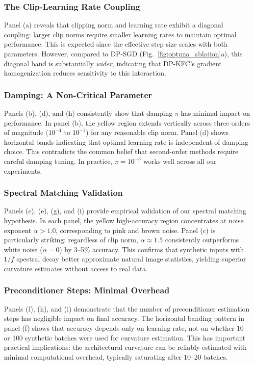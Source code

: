 \documentclass{article}
\theoremstyle{plain}
\theoremstyle{definition}
\theoremstyle{remark}
\begin{document}
  \subsubsection{The Clip-Learning Rate Coupling}

  Panel (a) reveals that clipping norm and learning rate exhibit a diagonal coupling: larger clip norms require smaller learning
  rates to maintain optimal performance. This is expected since the effective step size scales with both parameters. However,
  compared to DP-SGD (Fig.~\ref{fig:optuna_ablation}a), this diagonal band is substantially \textit{wider}, indicating that
  DP-KFC's gradient homogenization reduces sensitivity to this interaction.

  \subsubsection{Damping: A Non-Critical Parameter}

  Panels (b), (d), and (h) consistently show that damping $\pi$ has minimal impact on performance. In panel (b), the yellow
  region extends vertically across three orders of magnitude ($10^{-4}$ to $10^{-1}$) for any reasonable clip norm. Panel (d)
  shows horizontal bands indicating that optimal learning rate is independent of damping choice. This contradicts the common
  belief that second-order methods require careful damping tuning. In practice, $\pi = 10^{-3}$ works well across all our
  experiments.

  \subsubsection{Spectral Matching Validation}

  Panels (c), (e), (g), and (i) provide empirical validation of our spectral matching hypothesis. In each panel, the yellow
  high-accuracy region concentrates at noise exponent $\alpha > 1.0$, corresponding to pink and brown noise. Panel (c) is
  particularly striking: regardless of clip norm, $\alpha \approx 1.5$ consistently outperforms white noise ($\alpha = 0$) by
  3--5\% accuracy. This confirms that synthetic inputs with $1/f$ spectral decay better approximate natural image statistics,
  yielding superior curvature estimates without access to real data.

  \subsubsection{Preconditioner Steps: Minimal Overhead}

  Panels (f), (h), and (i) demonstrate that the number of preconditioner estimation steps has negligible impact on final
  accuracy. The horizontal banding pattern in panel (f) shows that accuracy depends only on learning rate, not on whether 10 or
  100 synthetic batches were used for curvature estimation. This has important practical implications: the architectural
  curvature can be reliably estimated with minimal computational overhead, typically saturating after 10--20 batches.
\end{document}
